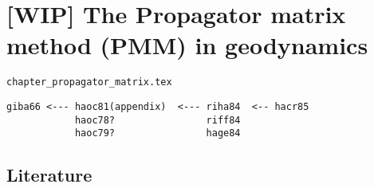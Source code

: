 \chapter{[WIP] The Propagator matrix method (PMM) in geodynamics} 

\begin{flushright} {\tiny {\color{gray} \tt chapter\_propagator\_matrix.tex}} \end{flushright}

\begin{verbatim}
giba66 <--- haoc81(appendix)  <--- riha84  <-- hacr85 
            haoc78?                riff84
            haoc79?                hage84

\end{verbatim}

\section{Literature}

